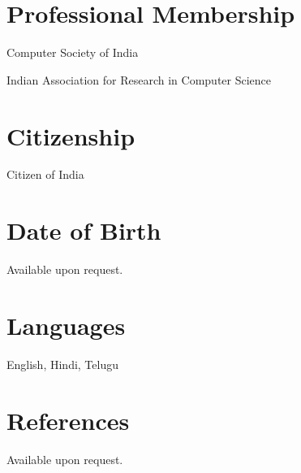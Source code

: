 \documentclass[11pt,margin,line]{res}
\begin{document}
\begin{resume}

\vspace{2em}

\section{\sc Professional Membership}

Computer Society of India

Indian Association for Research in Computer Science

\section{\sc Citizenship}
Citizen of India

\section{\sc Date of Birth}
Available upon request.

\section{\sc Languages}
English, Hindi, Telugu

\section{\sc References}
Available upon request.



\end{resume}
\end{document}
